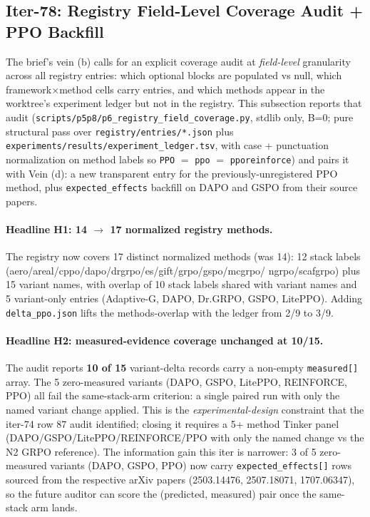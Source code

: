 \subsection{Iter-78: Registry Field-Level Coverage Audit + PPO Backfill}
\label{sec:p6-iter78-field-coverage}

The brief's vein (b) calls for an explicit coverage audit at
\emph{field-level} granularity across all registry entries: which optional
blocks are populated vs null, which framework$\times$method cells carry
entries, and which methods appear in the worktree's experiment ledger
but not in the registry. This subsection reports that audit
(\texttt{scripts/p5p8/p6\_registry\_field\_coverage.py}, stdlib only,
B=0; pure structural pass over \texttt{registry/entries/*.json} plus
\texttt{experiments/results/experiment\_ledger.tsv}, with case +
punctuation normalization on method labels so \texttt{PPO} $=$
\texttt{ppo} $=$ \texttt{pporeinforce}) and pairs it with Vein (d): a
new transparent entry for the previously-unregistered PPO method, plus
\texttt{expected\_effects} backfill on DAPO and GSPO from their
source papers.

\paragraph{Headline H1: 14 $\rightarrow$ 17 normalized registry methods.}
The registry now covers 17 distinct normalized methods (was 14):
12 stack labels (aero/areal/cppo/dapo/drgrpo/es/gift/grpo/gspo/mcgrpo/
ngrpo/scafgrpo) plus 15 variant names, with overlap of 10 stack labels
shared with variant names and 5 variant-only entries (Adaptive-G,
DAPO, Dr.GRPO, GSPO, LitePPO). Adding \texttt{delta\_ppo.json} lifts
the methods-overlap with the ledger from 2/9 to 3/9.

\paragraph{Headline H2: measured-evidence coverage unchanged at 10/15.}
The audit reports \textbf{10 of 15} variant-delta records carry a
non-empty \texttt{measured[]} array. The 5 zero-measured variants
(DAPO, GSPO, LitePPO, REINFORCE, PPO) all fail the same-stack-arm
criterion: a single paired run with only the named variant change
applied. This is the \emph{experimental-design} constraint that the
iter-74 row 87 audit identified; closing it requires a 5+ method
Tinker panel (DAPO/GSPO/LitePPO/REINFORCE/PPO with only the named
change vs the N2 GRPO reference). The information gain this iter is
narrower: 3 of 5 zero-measured variants (DAPO, GSPO, PPO) now carry
\texttt{expected\_effects[]} rows sourced from the respective arXiv
papers (2503.14476, 2507.18071, 1707.06347), so the future auditor
can score the (predicted, measured) pair once the same-stack arm
lands.

